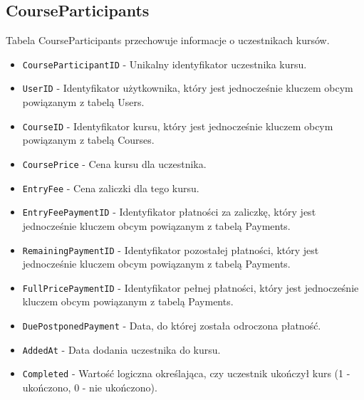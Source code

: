 \documentclass[11pt]{article}
\begin{document}
\subsection{CourseParticipants}
\label{sec:org7c3b8e7}
Tabela CourseParticipants przechowuje informacje o uczestnikach kursów.
\begin{itemize}
\item \texttt{CourseParticipantID} - Unikalny identyfikator uczestnika kursu.
\item \texttt{UserID} - Identyfikator użytkownika, który jest jednocześnie kluczem obcym powiązanym z tabelą Users.
\item \texttt{CourseID} - Identyfikator kursu, który jest jednocześnie kluczem obcym powiązanym z tabelą Courses.
\item \texttt{CoursePrice} - Cena kursu dla uczestnika.
\item \texttt{EntryFee} - Cena zaliczki dla tego kursu.
\item \texttt{EntryFeePaymentID} - Identyfikator płatności za zaliczkę, który jest jednocześnie kluczem obcym powiązanym z tabelą Payments.
\item \texttt{RemainingPaymentID} - Identyfikator pozostałej płatności, który jest jednocześnie kluczem obcym powiązanym z tabelą Payments.
\item \texttt{FullPricePaymentID} - Identyfikator pełnej płatności, który jest jednocześnie kluczem obcym powiązanym z tabelą Payments.
\item \texttt{DuePostponedPayment} - Data, do której została odroczona płatność.
\item \texttt{AddedAt} - Data dodania uczestnika do kursu.
\item \texttt{Completed} - Wartość logiczna określająca, czy uczestnik ukończył kurs (1 - ukończono, 0 - nie ukończono).
\end{itemize}
\end{document}
